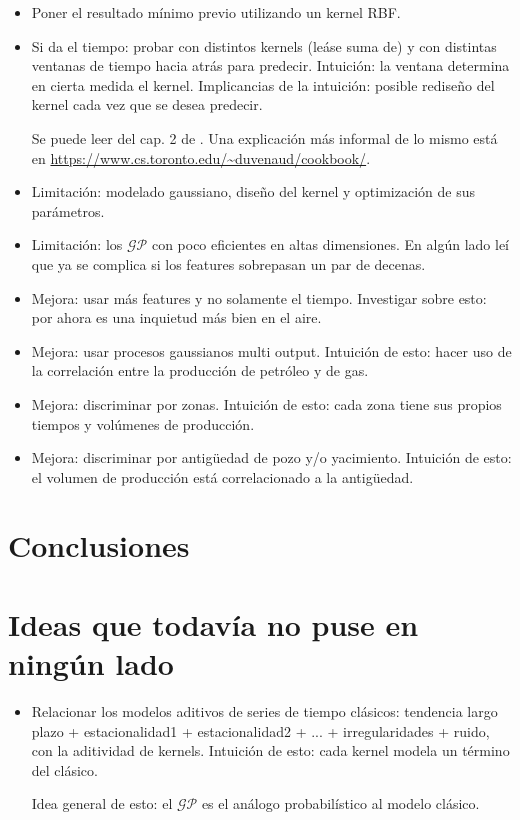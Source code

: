 \documentclass[a4paper]{article}
\newcommand{\gp}{\ensuremath{\mathcal{GP}}}
\begin{document}
\begin{itemize}
	\item Poner el resultado mínimo previo utilizando un kernel RBF.
	
	\item Si da el tiempo: probar con distintos kernels (leáse suma de) y con distintas ventanas de tiempo hacia atrás para predecir. Intuición: la ventana determina en cierta medida el kernel. Implicancias de la intuición: posible rediseño del kernel cada vez que se desea predecir.
	
	Se puede leer del cap. 2 de \cite{tesisduvenaud}. Una explicación más informal de lo mismo está en \url{https://www.cs.toronto.edu/~duvenaud/cookbook/}.
	
	\item Limitación: modelado gaussiano, diseño del kernel y optimización de sus parámetros.
	\item Limitación: los $\gp$ con poco eficientes en altas dimensiones. En algún lado leí que ya se complica si los features sobrepasan un par de decenas.
	\item Mejora: usar más features y no solamente el tiempo. Investigar sobre esto: por ahora es una inquietud más bien en el aire.
	\item Mejora: usar procesos gaussianos multi output. Intuición de esto: hacer uso de la correlación entre la producción de petróleo y de gas.
	\item Mejora: discriminar por zonas. Intuición de esto: cada zona tiene sus propios tiempos y volúmenes de producción.
	\item Mejora: discriminar por antigüedad de pozo y/o yacimiento. Intuición de esto: el volumen de producción está correlacionado a la antigüedad.
\end{itemize}



\section{Conclusiones}


\section{Ideas que todavía no puse en ningún lado}
\begin{itemize}
	\item Relacionar los modelos aditivos de series de tiempo clásicos: tendencia largo plazo + estacionalidad1 + estacionalidad2 + ... + irregularidades + ruido, con la aditividad de kernels. Intuición de esto: cada kernel modela un término del clásico.
	
	Idea general de esto: el $\gp$ es el análogo probabilístico al modelo clásico.
\end{itemize}
\end{document}
